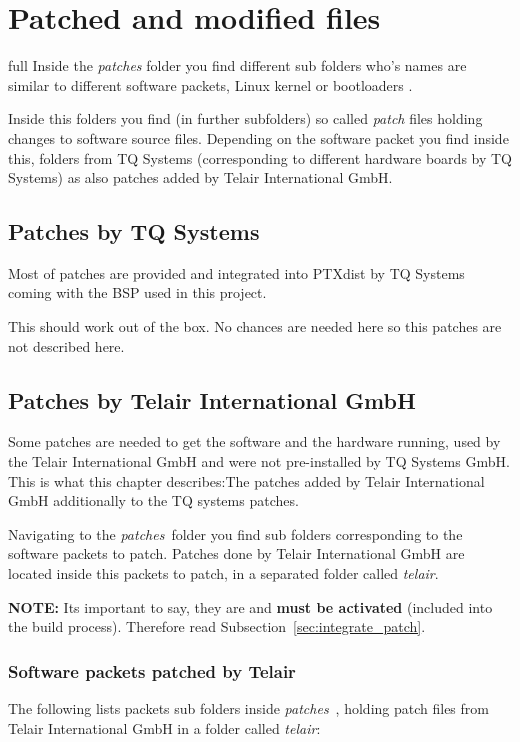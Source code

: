 \chapter{Patched and modified files}%
full\label{cha:patches}
Inside the \textit{patches} folder you find different sub folders who's names
are similar to different software packets, Linux kernel or bootloaders
\footnotemark.

Inside this folders you find (in further subfolders\footnotemark[2]) so called
\textit{patch} files holding changes to software source files. Depending on the
software packet you find inside this, folders from TQ Systems (corresponding to
different hardware boards by TQ Systems) as also patches added by Telair
International GmbH.


\section{Patches by TQ Systems}%
\label{sec:patches}
Most of patches are provided and integrated into PTXdist by TQ Systems
coming with the BSP used in this project.~\cite{tq_bsp119}

This should work out of the box. No chances are needed here so this patches are
not described here.

\section{Patches by Telair International GmbH}%
\label{sec:Patch_by_telair} Some patches are needed to get the software and the
hardware running, used by the Telair International GmbH and were not
pre-installed by TQ Systems GmbH. This is what this chapter describes:\@ The
patches added by Telair International GmbH additionally to the TQ systems
patches.

Navigating to the \textit{patches}~\footnotemark[2] folder you find sub folders
corresponding to the software packets to patch. Patches done by Telair
International GmbH are located inside this packets to patch, in a separated
folder called \textit{telair}.

\textbf{NOTE:} Its important to say, they are and \textbf{must be activated}
(included into the build process). Therefore read
Subsection~\ref{sec:integrate_patch}.

\subsection{Software packets patched by Telair}
The following lists packets sub folders inside
\textit{patches}~\footnotemark[2],
holding patch files from Telair International GmbH in a folder called
\textit{telair}:

